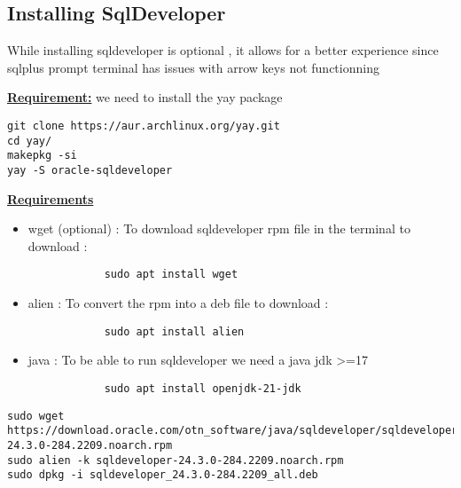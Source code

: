 \documentclass{article}
\begin{document}
\vspace{0.25cm}
\subsection{Installing SqlDeveloper}
While installing sqldeveloper is optional , it allows for a better experience since sqlplus prompt terminal
has issues with arrow keys not functionning

\begin{tcolorbox}[title = Arch Based]
\textbf{\underline{Requirement:}} we need to install the yay package 

    \begin{verbatim}
git clone https://aur.archlinux.org/yay.git
cd yay/
makepkg -si
yay -S oracle-sqldeveloper
    \end{verbatim}
\end{tcolorbox}

\vspace{0.5cm}
\begin{tcolorbox}[title = Debian and Ubuntu Based]


\vspace{0.25cm}
\textbf{\underline{Requirements}}

\begin{itemize}
    \item wget (optional) : To download sqldeveloper rpm file in the terminal to download : 
        \begin{verbatim}
            sudo apt install wget
        \end{verbatim}
    \item alien : To convert the rpm into a deb file to download : 
        \begin{verbatim}
            sudo apt install alien
        \end{verbatim}
    \item java : To be able to run sqldeveloper we need a java jdk \textgreater=17
        \begin{verbatim}
            sudo apt install openjdk-21-jdk
        \end{verbatim}
\end{itemize}
\begin{verbatim}
sudo wget https://download.oracle.com/otn_software/java/sqldeveloper/sqldeveloper-24.3.0-284.2209.noarch.rpm
sudo alien -k sqldeveloper-24.3.0-284.2209.noarch.rpm
sudo dpkg -i sqldeveloper_24.3.0-284.2209_all.deb 
\end{verbatim}

\end{tcolorbox}
\end{document}
